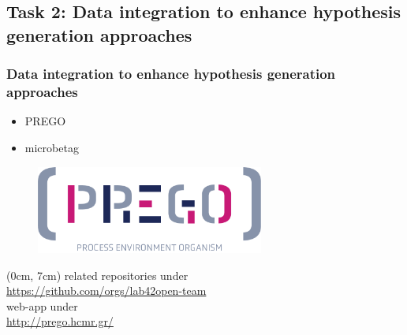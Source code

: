 \documentclass{beamer}
\begin{document}
   \begin{darkframes}
      \section{
      Task 2: Data integration to enhance hypothesis generation approaches
      }
      \begin{frame}
         \frametitle{Data integration to enhance hypothesis generation approaches}
         \begin{itemize}
            \item PREGO
            \item microbetag
         \end{itemize}
      \end{frame}
   \end{darkframes}






   \begin{frame}
      
      \begin{figure}
         \includegraphics[width=75mm]{resources/prego_logo.png}
      \end{figure}

      \begin{textblock*}{12cm}(0cm, 7cm)
         \centering
         \small related repositories under \\
         \small \href{https://github.com/orgs/lab42open-team}{https://github.com/orgs/lab42open-team} \\ 
         \small web-app under\\
         \small \href{http://prego.hcmr.gr/}{http://prego.hcmr.gr/}
      \end{textblock*}

   \end{frame}
\end{document}
